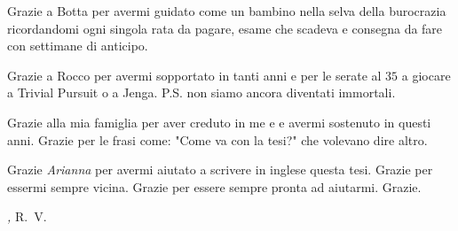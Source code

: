 Grazie a Botta per avermi guidato come un bambino nella selva della burocrazia
ricordandomi ogni singola rata da pagare, esame che scadeva e consegna da fare
con settimane di anticipo.

Grazie a Rocco per avermi sopportato in tanti anni e per le serate al $35$ a
giocare a Trivial Pursuit o a Jenga. P.S. non siamo ancora diventati immortali.

Grazie alla mia famiglia per aver creduto in me e e avermi sostenuto in questi
anni. Grazie per le frasi come: "Come va con la tesi?" che volevano dire altro.

Grazie \emph{Arianna} per avermi aiutato a scrivere in inglese questa tesi. Grazie
per essermi sempre vicina. Grazie per essere sempre pronta ad aiutarmi. Grazie.

\bigskip
 
\noindent\textit{\myLocation, \myTime}
\hfill R.~V.

\endgroup

